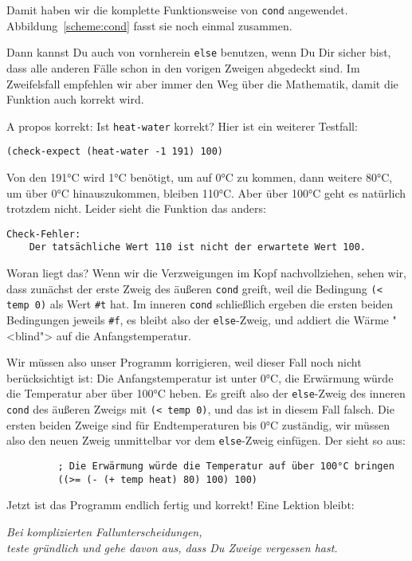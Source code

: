 %
Damit haben wir die komplette Funktionsweise von \texttt{cond}
angewendet. Abbildung~\ref{scheme:cond} fasst sie noch einmal zusammen.

Dann kannst Du auch von vornherein \texttt{else} benutzen, wenn Du Dir
sicher bist, dass alle anderen Fälle schon in den vorigen Zweigen
abgedeckt sind.  Im Zweifelsfall empfehlen wir aber immer den Weg über
die Mathematik, damit die Funktion auch korrekt wird.

A propos korrekt: Ist \texttt{heat-water} korrekt?  Hier ist ein
weiterer Testfall:
%
\begin{verbatim}
(check-expect (heat-water -1 191) 100)
\end{verbatim}
%
Von den 191°C wird 1°C benötigt, um auf 0°C zu kommen, dann weitere
80°C, um über 0°C hinauszukommen, bleiben 110°C.  Aber über 100°C geht
es natürlich trotzdem nicht.  Leider sieht die Funktion das anders:
%
\begin{verbatim}
Check-Fehler:
	Der tatsächliche Wert 110 ist nicht der erwartete Wert 100.
\end{verbatim}
%
Woran liegt das?  Wenn wir die Verzweigungen im Kopf nachvollziehen,
sehen wir, dass zunächst der erste Zweig des äußeren \texttt{cond}
greift, weil die Bedingung \verb|(< temp 0)| als Wert \verb|#t| hat.
Im inneren \texttt{cond} schließlich ergeben die ersten beiden
Bedingungen jeweils \verb|#f|, es bleibt also der \texttt{else}-Zweig,
und addiert die Wärme "<blind"> auf die Anfangstemperatur.

Wir müssen also unser Programm korrigieren, weil dieser Fall noch
nicht berücksichtigt ist: Die Anfangstemperatur ist unter 0°C, die
Erwärmung würde die Temperatur aber über 100°C heben.  Es greift also
der \texttt{else}-Zweig des inneren \texttt{cond} des äußeren Zweigs
mit \texttt{(< temp 0)}, und das ist in diesem Fall falsch.  Die
ersten beiden Zweige sind für Endtemperaturen bis 0°C zuständig, wir
müssen also den neuen Zweig unmittelbar vor dem \texttt{else}-Zweig
einfügen.  Der sieht so aus:
%
\begin{verbatim}
         ; Die Erwärmung würde die Temperatur auf über 100°C bringen
         ((>= (- (+ temp heat) 80) 100) 100)
\end{verbatim}
%
Jetzt ist das Programm endlich fertig und korrekt! Eine Lektion bleibt:
%
\begin{center}
  \emph{Bei komplizierten Fallunterscheidungen,\\ teste gründlich und
    gehe davon aus, dass Du Zweige vergessen hast.}
\end{center}

